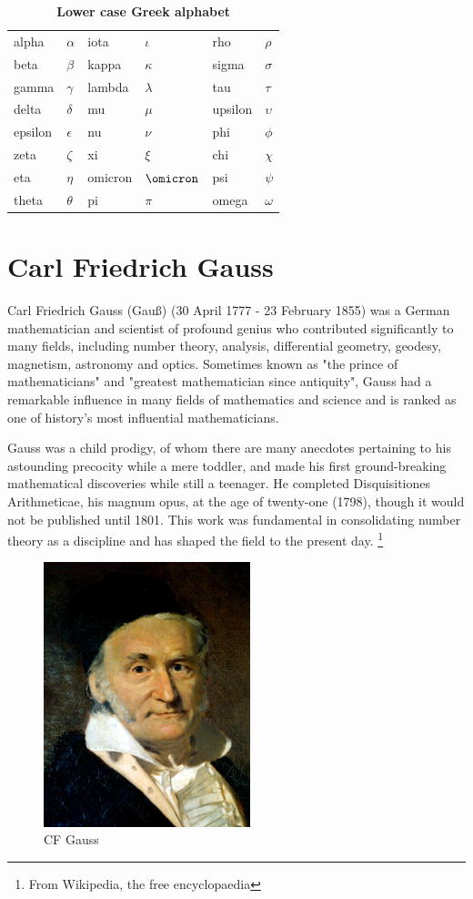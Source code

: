 \documentclass[
  a4paper,
  DIV=11,
  numbers=noendperiod,
  oneside]{scrreprt}
\theoremstyle{definition}
\theoremstyle{remark}
\begin{document}
\begin{longtable}[]{@{}llllll@{}}
\caption{\textbf{Lower case Greek alphabet}}\tabularnewline
\toprule\noalign{}
\endfirsthead
\endhead
\bottomrule\noalign{}
\endlastfoot
alpha & \(\alpha\) & iota & \(\iota\) & rho & \(\rho\) \\
beta & \(\beta\) & kappa & \(\kappa\) & sigma & \(\sigma\) \\
gamma & \(\gamma\) & lambda & \(\lambda\) & tau & \(\tau\) \\
delta & \(\delta\) & mu & \(\mu\) & upsilon & \(\upsilon\) \\
epsilon & \(\epsilon\) & nu & \(\nu\) & phi & \(\phi\) \\
zeta & \(\zeta\) & xi & \(\xi\) & chi & \(\chi\) \\
eta & \(\eta\) & omicron & \(\omicron\) & psi & \(\psi\) \\
theta & \(\theta\) & pi & \(\pi\) & omega & \(\omega\) \\
\end{longtable}

\section{Carl Friedrich Gauss}\label{carl-friedrich-gauss}

Carl Friedrich Gauss (Gauß) (30 April 1777 - 23 February 1855) was a
German mathematician and scientist of profound genius who contributed
significantly to many fields, including number theory, analysis,
differential geometry, geodesy, magnetism, astronomy and optics.
Sometimes known as "the prince of mathematicians" and "greatest
mathematician since antiquity", Gauss had a remarkable influence in many
fields of mathematics and science and is ranked as one of history's most
influential mathematicians.

Gauss was a child prodigy, of whom there are many anecdotes pertaining
to his astounding precocity while a mere toddler, and made his first
ground-breaking mathematical discoveries while still a teenager. He
completed Disquisitiones Arithmeticae, his magnum opus, at the age of
twenty-one (1798), though it would not be published until 1801. This
work was fundamental in consolidating number theory as a discipline and
has shaped the field to the present day. \footnote{From Wikipedia, the
  free encyclopaedia}

\begin{figure}[H]

{\centering \includegraphics[width=6cm,height=\textheight,keepaspectratio]{Gauss.jpg}

}

\caption{CF Gauss}

\end{figure}%
\end{document}
